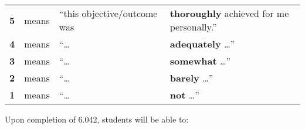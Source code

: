 \documentclass[handout]{mcs}
\begin{document}
\begin{center}
\begin{tabular}{rcll}
\hline
\textbf{5} & means &  ``this objective/outcome was & \textbf{thoroughly}
achieved for me personally.''\\
\textbf{4} & means &  ``\dots & \textbf{adequately} \dots''\\
\textbf{3} & means &  ``\dots & \textbf{somewhat} \dots''\\
\textbf{2} & means &  ``\dots & \textbf{barely} \dots''\\
\textbf{1} & means &  ``\dots & \textbf{not} \dots''\\
\hline
\end{tabular}
\end{center}
\fi

Upon completion of 6.042, students will be able to:
\end{document}
